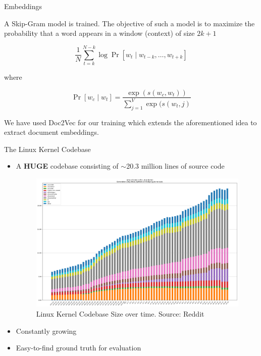 \documentclass{beamer}
\begin{document}
\begin{frame}{Embeddings}

A Skip-Gram model is trained. The objective of such a model is to maximize the probability that a word appears in a window (context) of size $2k + 1$

$$\frac {1} {N} \sum_{t = k}^{N - k} \log \Pr [w_t \mid w_{t-k}, \dots, w_{t + k}]$$

where 

$$\Pr [w_c \mid w_t] = \frac {\exp(s(w_c, w_t))} {\sum_{j = 1}^{V} \exp(s(w_t, j)}$$

We have used Doc2Vec for our training which extends the aforementioned idea to extract document embeddings.
    
\end{frame}

\begin{frame}{The Linux Kernel Codebase}
    \begin{itemize}
        \item A \textbf{HUGE} codebase consisting of $\sim$20.3 million lines of source code
        \begin{figure}
            \centering
            \includegraphics[scale=0.15]{linux.png}
            \caption{Linux Kernel Codebase Size over time. Source: Reddit}
            \label{fig:linux}
        \end{figure}
        
        \item Constantly growing
        \item Easy-to-find ground truth for evaluation
    \end{itemize}
    
    
\end{frame}
\end{document}
